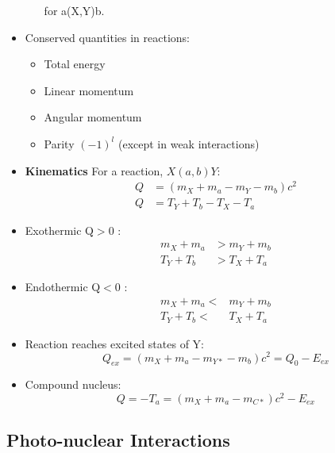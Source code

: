 \documentclass[letter]{article}
\begin{document}
\begin{itemize}
\begin{itemize}
\begin{equation*}
    \end{equation*}
    for a(X,Y)b.
  \end{itemize}
\item Conserved quantities in reactions:
  \begin{itemize}
  \item Total energy
  \item Linear momentum
  \item Angular momentum
  \item Parity $(-1)^l$ (except in weak interactions)
\end{itemize}
\item \textbf{Kinematics} For a reaction, $X(a,b)Y$:
  \begin{equation*}
    \begin{split}
      Q&= (m_{X}+m_{a}-m_{Y}-m_{b})c^{2}\\
      Q& =T_{Y}+T_{b}-T_{X}-T_{a}
\end{split}
\end{equation*}
\item Exothermic Q$>$0 :
  \begin{equation*}
  \begin{split}
   m_{X}+m_{a}&>m_{Y}+m_{b}\\
   T_{Y}+T_{b}&>T_{X}+T_{a}
  \end{split}
\end{equation*}
\item Endothermic Q$<$0 :
  \begin{equation*}
  \begin{split}
    m_{X}+m_{a}<&m_{Y}+m_{b}\\
T_{Y}+T_{b}<&T_{X}+T_{a}
  \end{split}
\end{equation*}
\item Reaction reaches excited states of Y:
  \begin{equation*}
Q_{ex} = (m_{X}+m_{a}-m_{Y*}-m_{b})c^{2}  = Q_{0}-E_{ex}
\end{equation*}
\item Compound nucleus:
  \begin{equation*}
Q = -T_{a} = (m_{X}+m_{a}-m_{C*})c^{2}-E_{ex}
\end{equation*}

\end{itemize}

\subsection{Photo-nuclear Interactions}
\end{document}
